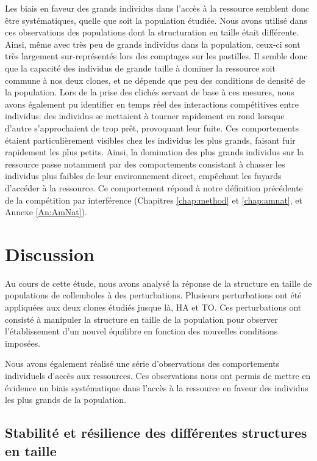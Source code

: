 Les biais en faveur des grands individus dans l'accès à la ressource semblent
donc être systématiques, quelle que soit la population étudiée. Nous avons
utilisé dans ces observations des populations dont la structuration en taille était
différente.
Ainsi, même avec très peu de grands individus dans la population, ceux-ci sont
très largement sur-représentés lors des comptages sur les pastilles. Il semble
donc que la capacité des individus de grande taille à dominer la ressource soit
commune à nos deux clones, et ne dépende que peu des conditions de densité de la
population. Lors de la prise des clichés servant de base à ces mesures, nous
avons également pu identifier en temps réel des interactions
compétitives entre individus: des individus se
mettaient à tourner rapidement en rond lorsque d'autre s'approchaient de trop prêt, provoquant leur fuite. Ces comportements étaient
particulièrement visibles chez les individus les plus grands, faisant fuir
rapidement les plus petits. Ainsi, la
domination des plus grands individus sur la ressource passe notamment par des
comportements consistant à chasser les individus plus faibles de leur
environnement direct, empêchant les fuyards d'accéder à la ressource. Ce
comportement répond à notre définition précédente de la compétition par
interférence (Chapitres \ref{chap:method} et \ref{chap:amnat}, et Annexe
\ref{An:AmNat}).

\section{Discussion}

Au cours de cette étude, nous avons analysé la réponse de la structure en taille
de populations de collemboles à des perturbations. Plusieurs perturbations ont
été appliquées aux deux clones étudiés jusque là, HA et TO. Ces perturbations
ont consisté à manipuler la structure en taille de la population pour observer
l'établissement d'un nouvel équilibre en fonction des nouvelles conditions
imposées. 

Nous avons également réalisé une série d'observations des
comportements individuels d'accès aux ressources. Ces observations nous ont
permis de mettre en évidence un biais systématique dans l'accès à la ressource
en faveur des individus les plus grands de la population. 

\subsection{Stabilité et résilience des différentes structures en taille}



